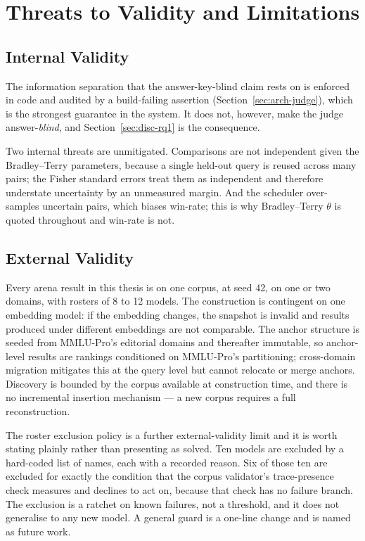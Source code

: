 \section{Threats to Validity and Limitations}\label{sec:disc-validity}

\subsection{Internal Validity}\label{subsec:disc-internal-validity}

The information separation that the answer-key-blind claim rests on is
enforced in code and audited by a build-failing assertion
(Section~\ref{sec:arch-judge}), which is the strongest guarantee in the
system. It does not, however, make the judge answer-\emph{blind}, and
Section~\ref{sec:disc-rq1} is the consequence.

Two internal threats are unmitigated. Comparisons are not independent
given the Bradley--Terry parameters, because a single held-out query is
reused across many pairs; the Fisher standard errors treat them as
independent and therefore understate uncertainty by an unmeasured
margin. And the scheduler over-samples uncertain pairs, which biases
win-rate; this is why Bradley--Terry $\theta$ is quoted throughout and
win-rate is not.

\subsection{External Validity}\label{subsec:disc-external-validity}

Every arena result in this thesis is on one corpus, at seed 42, on one
or two domains, with rosters of 8 to 12 models. The construction is
contingent on one embedding model: if the embedding changes, the
snapshot is invalid and results produced under different embeddings are
not comparable. The anchor structure is seeded from MMLU-Pro's
editorial domains and thereafter immutable, so anchor-level results are
rankings conditioned on MMLU-Pro's partitioning; cross-domain migration
mitigates this at the query level but cannot relocate or merge anchors.
Discovery is bounded by the corpus available at construction time,
and there is no incremental insertion mechanism --- a new corpus
requires a full reconstruction.

The roster exclusion policy is a further external-validity limit and it
is worth stating plainly rather than presenting as solved. Ten models
are excluded by a hard-coded list of names, each with a recorded
reason. Six of those ten are excluded for exactly the condition that
the corpus validator's trace-presence check measures and declines to
act on, because that check has no failure branch. The exclusion is a
ratchet on known failures, not a threshold, and it does not generalise
to any new model. A general guard is a one-line change and is named as
future work.

